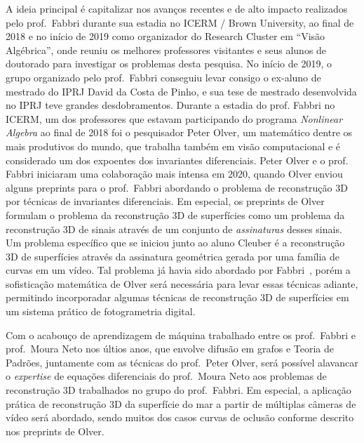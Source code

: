 \documentclass[a4paper,titlepage]{article}
\begin{document}
A ideia principal é capitalizar nos avanços recentes e de alto impacto
realizados pelo prof.\ Fabbri durante sua estadia no ICERM / Brown University,
ao final de 2018 e no início de 2019 como organizador do Research Cluster em
``Visão Algébrica'', onde reuniu os melhores professores visitantes e seus alunos
de doutorado para investigar os problemas desta pesquisa. No início de 2019, o
grupo organizado pelo prof.\ Fabbri conseguiu levar consigo o ex-aluno de
mestrado do IPRJ David da Costa de Pinho, e sua tese de mestrado desenvolvida no
IPRJ teve grandes desdobramentos. Durante a estadia do prof. Fabbri no ICERM,
um dos professores que estavam participando do programa \emph{Nonlinear
Algebra} ao final de 2018 foi o pesquisador Peter Olver, um matemático dentre os
mais produtivos do mundo, que trabalha também em visão computacional e é
considerado um dos expoentes dos invariantes diferenciais. Peter Olver e o prof.
Fabbri iniciaram uma colaboração mais intensa em 2020, quando Olver enviou
alguns preprints para o prof.\ Fabbri abordando o problema de reconstrução 3D
por técnicas de invariantes diferenciais. Em especial, os preprints de Olver
formulam o problema da reconstrução 3D de superfícies como um problema da
reconstrução 3D de sinais através de um conjunto de \emph{assinaturas} desses
sinais. Um problema específico que se iniciou junto ao aluno Cleuber é a
reconstrução 3D de superfícies através da assinatura geométrica gerada por uma
família de curvas em um vídeo. Tal problema já havia sido abordado por
Fabbri~\cite{Fabbri:Kimia:IJCV2016}, porém a sofisticação matemática de Olver
será necessária para levar essas técnicas adiante, permitindo
incorporadar algumas técnicas de reconstrução 3D de superfícies em um sistema
prático de fotogrametria digital.

Com o acabouço de aprendizagem de máquina trabalhado entre os prof.\ Fabbri e
prof.\ Moura Neto nos últios anos, que envolve difusão em grafos e Teoria de
Padrões, juntamente com as técnicas do prof.\ Peter Olver, será possível
alavancar o \emph{expertise} de equações diferenciais do prof.\ Moura Neto aos problemas de
reconstrução 3D trabalhados no grupo do prof.\ Fabbri. Em especial, a aplicação
prática de reconstrução 3D da superfície do mar a partir de múltiplas câmeras de
vídeo será abordado, sendo muitos dos casos curvas de oclusão conforme descrito
nos preprints de Olver.
\end{document}
